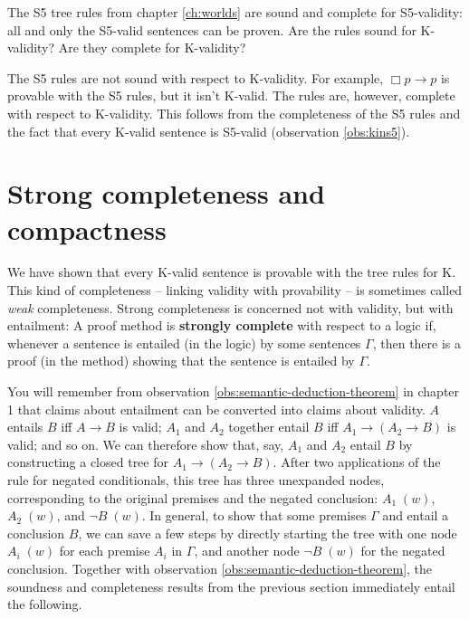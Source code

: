 \begin{exercise}
  The S5 tree rules from chapter \ref{ch:worlds} are sound and complete for
  S5-validity: all and only the S5-valid sentences can be proven. Are the rules
  sound for K-validity? Are they complete for K-validity?
\end{exercise}
\begin{solution}
  The S5 rules are not sound with respect to K-validity. For example,
  $\Box p \to p$ is provable with the S5 rules, but it isn't K-valid. The rules
  are, however, complete with respect to K-validity. This follows from the
  completeness of the S5 rules and the fact that every K-valid sentence is
  S5-valid (observation \ref{obs:kins5}).
\end{solution}

\iffalse
\section{Strong completeness and compactness}%
\label{sec:compactness}


We have shown that every K-valid sentence is provable with the tree rules for K.
This kind of completeness -- linking validity with provability -- is sometimes
called \emph{weak} completeness. Strong completeness is concerned not with
validity, but with entailment: A proof method is \textbf{strongly complete} with
respect to a logic if, whenever a sentence is entailed (in the logic) by some
sentences $\Gamma$, then there is a proof (in the method) showing that the
sentence is entailed by $\Gamma$.

You will remember from observation \ref{obs:semantic-deduction-theorem} in
chapter 1 that claims about entailment can be converted into claims about
validity. $A$ entails $B$ iff $A \to B$ is valid; $A_{1}$ and $A_{2}$ together
entail $B$ iff $A_{1} \to (A_{2} \to B)$ is valid; and so on. We can therefore
show that, say, $A_{1}$ and $A_{2}$ entail $B$ by constructing a closed tree for
$A_{1} \to (A_{2} \to B)$. After two applications of the rule for negated
conditionals, this tree has three unexpanded nodes, corresponding to the
original premises and the negated conclusion: $A_{1}\; (w)$, $A_{2}\; (w)$, and
$\neg B\; (w)$. In general, to show that some premises $\Gamma$ and entail a
conclusion $B$, we can save a few steps by directly starting the tree with one
node $A_{i}\; (w)$ for each premise $A_{i}$ in $\Gamma$, and another node
$\neg B\; (w)$ for the negated conclusion. Together with observation
\ref{obs:semantic-deduction-theorem}, the soundness and completeness results
from the previous section immediately entail the following.

